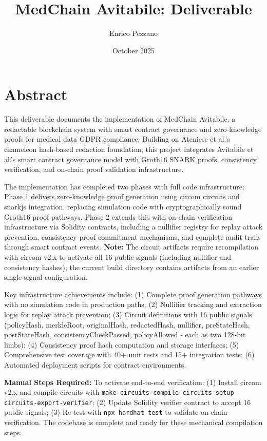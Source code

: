 \documentclass[11pt,a4paper]{article}
\title{MedChain Avitabile: Deliverable}
\author{Enrico Pezzano}
\date{October 2025}
\begin{document}
\maketitle

\section*{Abstract}

This deliverable documents the implementation of MedChain Avitabile, a redactable blockchain system with smart contract governance and zero-knowledge proofs for medical data GDPR compliance. Building on Ateniese et al.'s chameleon hash-based redaction foundation, this project integrates Avitabile et al.'s smart contract governance model with Groth16 SNARK proofs, consistency verification, and on-chain proof validation infrastructure.

The implementation has completed two phases with full code infrastructure: Phase 1 delivers zero-knowledge proof generation using circom circuits and snarkjs integration, replacing simulation code with cryptographically sound Groth16 proof pathways. Phase 2 extends this with on-chain verification infrastructure via Solidity contracts, including a nullifier registry for replay attack prevention, consistency proof commitment mechanisms, and complete audit trails through smart contract events. \textbf{Note:} The circuit artifacts require recompilation with circom v2.x to activate all 16 public signals (including nullifier and consistency hashes); the current build directory contains artifacts from an earlier single-signal configuration.

Key infrastructure achievements include: (1) Complete proof generation pathways with no simulation code in production paths; (2) Nullifier tracking and extraction logic for replay attack prevention; (3) Circuit definitions with 16 public signals (policyHash, merkleRoot, originalHash, redactedHash, nullifier, preStateHash, postStateHash, consistencyCheckPassed, policyAllowed - each as two 128-bit limbs); (4) Consistency proof hash computation and storage interfaces; (5) Comprehensive test coverage with 40+ unit tests and 15+ integration tests; (6) Automated deployment scripts for contract environments.

\textbf{Manual Steps Required:} To activate end-to-end verification: (1) Install circom v2.x and compile circuits with \texttt{make circuits-compile circuits-setup circuits-export-verifier}; (2) Update Solidity verifier contract to accept 16 public signals; (3) Re-test with \texttt{npx hardhat test} to validate on-chain verification. The codebase is complete and ready for these mechanical compilation steps.
\end{document}
